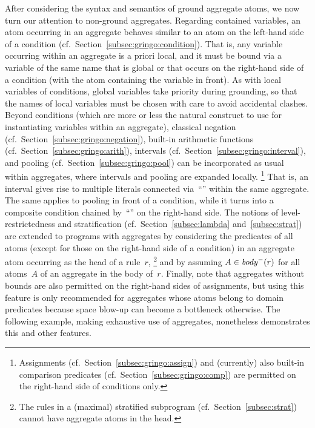 After considering the syntax and semantics of ground aggregate atoms,
we now turn our attention to non-ground aggregates.
Regarding contained variables, an atom occurring in an aggregate behaves
similar to an atom on the left-hand side of a condition
(cf.\ Section~\ref{subsec:gringo:condition}).
That is, any variable occurring within an aggregate is a priori local,
and it must be bound via a variable of the same name that is global
or that occurs on the right-hand side of a condition
(with the atom containing the variable in front).
As with local variables of conditions, global variables take priority
during grounding, so that the names of local variables must be chosen
with care to avoid accidental clashes.
Beyond conditions (which are more or less the natural construct to use
for instantiating variables within an aggregate),
classical negation (cf.\ Section~\ref{subsec:gringo:negation}),
built-in arithmetic functions (cf.\ Section~\ref{subsec:gringo:arith}),
intervals (cf.\ Section~\ref{subsec:gringo:interval}), and 
pooling (cf.\ Section~\ref{subsec:gringo:pool})
can be incorporated as usual within aggregates,
where intervals and pooling are expanded locally.%
\footnote{%
  Assignments (cf.\ Section~\ref{subsec:gringo:assign}) and (currently)
  also built-in comparison predicates (cf.\ Section~\ref{subsec:gringo:comp})
  are permitted on the right-hand side of conditions only.}
That is, an interval gives rise to multiple literals connected via~``\code{,}''
within the same aggregate.
The same applies to pooling in front of a condition,
while it turns into a composite condition chained by~``\code{:}'' on the right-hand side.
The notions of level-restrictedness and stratification
(cf.\ Section~\ref{subsec:lambda} and~\ref{subsec:strat}) are extended
to programs with aggregates by
considering the predicates of all atoms (except for those on the right-hand side of a condition)
in an aggregate atom occurring as the head of a rule~$r$,%
\footnote{%
  The rules in a (maximal) stratified subprogram (cf.\ Section~\ref{subsec:strat})
  cannot have aggregate atoms in the head.}
and by assuming $A\in\mathit{body}^-(r)$ for all atoms~$A$ of an aggregate in the body of~$r$.
Finally, note that aggregates without bounds are also permitted on the
right-hand sides of assignments, but using this feature is only recommended
for aggregates whose atoms belong to domain predicates because space blow-up
can become a bottleneck otherwise.
The following example, making exhaustive use of aggregates,
nonetheless demonstrates this and other features.

